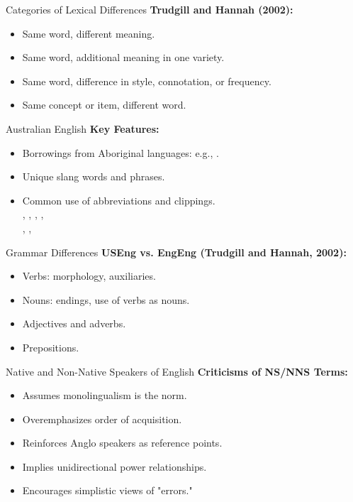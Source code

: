 \documentclass{beamer}
\begin{document}
\begin{frame}{Categories of Lexical Differences}
\textbf{Trudgill and Hannah (2002):}
\begin{itemize}
    \item Same word, different meaning.
    \item Same word, additional meaning in one variety.
    \item Same word, difference in style, connotation, or frequency.
    \item Same concept or item, different word.
\end{itemize}
\end{frame}

\begin{frame}{Australian English}
\textbf{Key Features:}
\begin{itemize}
    \item Borrowings from Aboriginal languages: e.g., .
    \item Unique slang words and phrases.
    \item Common use of abbreviations and clippings.
      \\ , , , , 
      \\ , , 
\end{itemize}
\end{frame}

\begin{frame}{Grammar Differences}
\textbf{USEng vs. EngEng (Trudgill and Hannah, 2002):}
\begin{itemize}
    \item Verbs: morphology, auxiliaries.
    \item Nouns: endings, use of verbs as nouns.
    \item Adjectives and adverbs.
    \item Prepositions.
\end{itemize}
\end{frame}

\begin{frame}{Native and Non-Native Speakers of English}
\textbf{Criticisms of NS/NNS Terms:}
\begin{itemize}
    \item Assumes monolingualism is the norm.
    \item Overemphasizes order of acquisition.
    \item Reinforces Anglo speakers as reference points.
    \item Implies unidirectional power relationships.
    \item Encourages simplistic views of "errors."
\end{itemize}
\end{frame}
\end{document}
